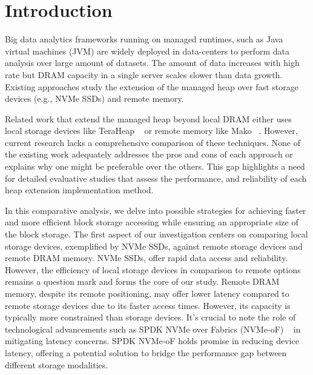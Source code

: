 \section{Introduction}
Big data analytics frameworks running on managed runtimes, such as Java virtual
machines (JVM) are widely deployed in data-centers to perform data analysis over
large amount of datasets. The amount of data increases with high rate but DRAM
capacity in a single server scales slower than data growth. Existing approaches
study the extension of the managed heap over fast storage devices (e.g., NVMe
SSDs) and remote memory.


Related work that extend the managed heap beyond local DRAM either uses local storage devices like TeraHeap ~\cite{teraheap} or remote memory like Mako ~\cite{mako}. However, current
research lacks a comprehensive comparison of these techniques. None of the
existing work adequately addresses the pros and cons of each approach or
explains why one might be preferable over the others. This gap highlights a need
for detailed evaluative studies that assess the performance, and reliability of
each heap extension implementation method.



In this comparative analysis, we delve into possible strategies for achieving
faster and more efficient block storage accessing while ensuring an appropriate
size of the block storage. The first aspect of our investigation centers on
comparing local storage devices, exemplified by NVMe SSDs, against remote
storage devices and remote DRAM memory. NVMe SSDs, offer rapid data access and
reliability. However, the efficiency of local storage devices in comparison to
remote options remains a question mark and forms the core of our study. Remote
DRAM memory, despite its remote positioning, may offer lower latency compared to
remote storage devices due to its faster access times. However, its capacity is
typically more constrained than storage devices. It's crucial to note the role
of technological advancements such as SPDK NVMe over Fabrics (NVMe-oF) ~\cite{spdk} in
mitigating latency concerns. SPDK NVMe-oF holds promise in reducing device
latency, offering a potential solution to bridge the performance gap between
different storage modalities. 

